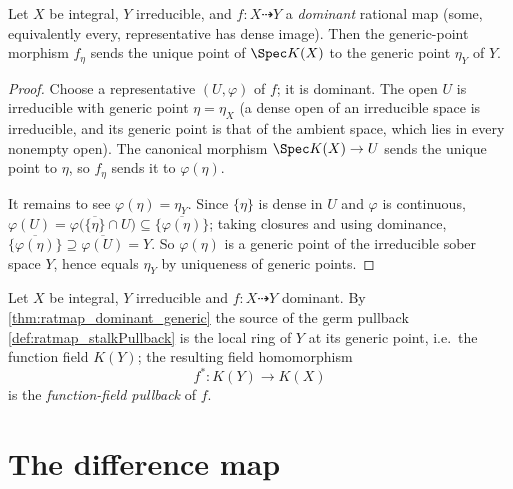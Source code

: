 \begin{theorem}
  \label{thm:ratmap_dominant_generic}
  \leanok
  Let \(X\) be integral, \(Y\) irreducible, and \(f : X \dashrightarrow Y\) a
  \emph{dominant} rational map (some, equivalently every, representative has
  dense image). Then the generic-point morphism \(f_\eta\) sends the unique
  point of \(\Spec K(X)\) to the generic point \(\eta_Y\) of \(Y\).
\end{theorem}
\begin{proof}
  \leanok
  Choose a representative \((U, \varphi)\) of \(f\); it is dominant. The open
  \(U\) is irreducible with generic point \(\eta = \eta_X\) (a dense open of an
  irreducible space is irreducible, and its generic point is that of the ambient
  space, which lies in every nonempty open). The canonical morphism
  \(\Spec K(X) \to U\) sends the unique point to \(\eta\), so
  \(f_\eta\) sends it to \(\varphi(\eta)\).

  It remains to see \(\varphi(\eta) = \eta_Y\). Since \(\{\eta\}\) is dense in
  \(U\) and \(\varphi\) is continuous,
  \(\varphi(U) = \varphi\bigl(\overline{\{\eta\}} \cap U\bigr) \subseteq
  \overline{\{\varphi(\eta)\}}\); taking closures and using dominance,
  \(\overline{\{\varphi(\eta)\}} \supseteq \overline{\varphi(U)} = Y\). So
  \(\varphi(\eta)\) is a generic point of the irreducible sober space \(Y\),
  hence equals \(\eta_Y\) by uniqueness of generic points.
\end{proof}

\begin{definition}
  \label{def:ratmap_functionFieldPullback}
  \leanok
  Let \(X\) be integral, \(Y\) irreducible and \(f : X \dashrightarrow Y\)
  dominant. By \ref{thm:ratmap_dominant_generic} the source of the germ pullback
  \ref{def:ratmap_stalkPullback} is the local ring of \(Y\) at its generic
  point, i.e.\ the function field \(K(Y)\); the resulting field homomorphism
  \[
    f^* : K(Y) \longrightarrow K(X)
  \]
  is the \emph{function-field pullback} of \(f\).
\end{definition}

\section{The difference map}
\label{sec:difference_map}


